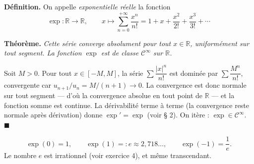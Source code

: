 ﻿%



\begin{tcolorbox}[thmbox]
  \textbf{Définition.}\enspace%
  On appelle \emph{exponentielle réelle} la fonction
  \[
    \exp : \mathbb{R} \longrightarrow \mathbb{R}, \qquad
    x \longmapsto \sum_{n=0}^{+\infty} \frac{x^n}{n!}
    = 1 + x + \frac{x^2}{2!} + \frac{x^3}{3!} + \cdots
  \]

  \medskip
  \textbf{Théorème.}\enspace%
  \textit{Cette série converge absolument pour tout $x \in \mathbb{R}$,
  uniformément sur tout segment. La fonction $\exp$ est de classe
  $\mathcal{C}^\infty$ sur $\mathbb{R}$.}
\end{tcolorbox}

\begin{mdframed}[style=proofbar]
  Soit $M > 0$. Pour tout $x \in [-M, M]$, la série
  $\sum \dfrac{|x|^n}{n!}$ est dominée par
  $\sum \dfrac{M^n}{n!}$, convergente car
  $u_{n+1}/u_n = M/(n+1) \to 0$. La convergence est donc normale
  sur tout segment — d'où la convergence absolue en tout point de
  $\mathbb{R}$ — et la fonction somme est continue. La dérivabilité
  terme à terme (la convergence reste normale après dérivation) donne
  $\exp' = \exp$ (voir § 2). On itère : $\exp \in \mathcal{C}^\infty$.
  \hfill$\blacksquare$
\end{mdframed}

\[
  \exp(0) = 1, \qquad
  \exp(1) =: e \approx 2{,}718\ldots, \qquad
  \exp(-1) = \frac{1}{e}.
\]
Le nombre $e$ est irrationnel (voir exercice 4), et même transcendant.

\decsep{}


